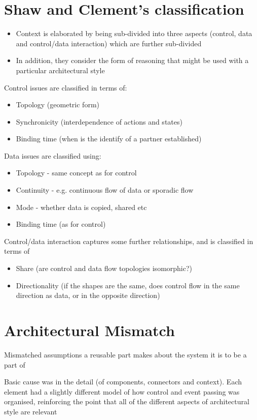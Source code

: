 \documentclass{article}[18pt]
\begin{document}
\section{Shaw and Clement's classification}
\begin{itemize}
	\item Context is elaborated by being sub-divided into three aspects (control, data and control/data interaction) which are further sub-divided
	\item In addition, they consider the form of reasoning that might be used with a particular architectural style
\end{itemize}
Control issues are classified in terms of:
\begin{itemize}
	\item Topology (geometric form)
	\item Synchronicity (interdependence of actions and states)
	\item Binding time (when is the identify of a partner established)
\end{itemize}
Data issues are classified using:
\begin{itemize}
	\item Topology - same concept as for control
	\item Continuity - e.g. continuous flow of data or sporadic flow
	\item Mode - whether data is copied, shared etc
	\item Binding time (as for control)
\end{itemize}
Control/data interaction captures some further relationships, and is classified in terms of
\begin{itemize}
	\item Share (are control and data flow topologies isomorphic?)
	\item Directionality (if the shapes are the same, does control flow in the same direction as data, or in the opposite direction)
\end{itemize}
\section{Architectural Mismatch}
\begin{definition}
Mismatched assumptions a reusable part makes about the system it is to be a part of
\end{definition}
Basic cause was in the detail (of components, connectors and context). Each element had a slightly different model of how control and event passing was organised, reinforcing the point that all of the different aspects of architectural style are relevant
\end{document}
